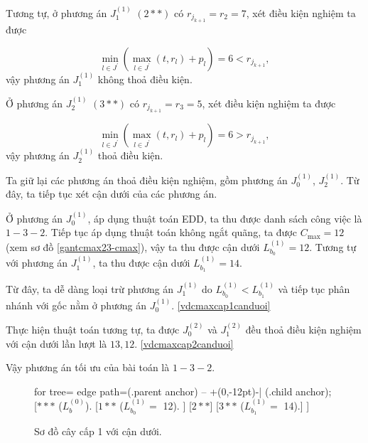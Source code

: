 \begin{vd}
Tương tự, ở phương án $J_1^{(1)}$ $(2**)$ có $r_{j_{k+1}} = r_2 = 7$, xét điều kiện nghiệm ta được

\begin{equation*}
\underset{l \in J^{'}}{\min} (\underset{l \in J^{'}}{\max} (t, r_l) + p_l) = 6 < r_{j_{k+1}},
\end{equation*}
vậy phương án $J_1^{(1)}$ không thoả điều kiện.


Ở phương án $J_2^{(1)}$ $(3**)$ có $r_{j_{k+1}} = r_3 = 5$, xét điều kiện nghiệm ta được

\begin{equation*}
\underset{l \in J^{'}}{\min} (\underset{l \in J^{'}}{\max} (t, r_l) + p_l) = 6 > r_{j_{k+1}},
\end{equation*}
vậy phương án $J_2^{(1)}$ thoả điều kiện.

Ta giữ lại các phương án thoả điều kiện nghiệm, gồm phương án $J_0^{(1)}$, $J_2^{(1)}$. Từ đây, ta tiếp tục xét cận dưới của các phương án.

Ở phương án $J_0^{(1)}$, áp dụng thuật toán EDD, ta thu được danh sách công việc là $1-3-2$. Tiếp tục áp dụng thuật toán không ngắt quãng, ta được $C_{\max} = 12$ (xem sơ đồ \eqref{gantcmax23-cmax}), vậy ta thu được cận dưới $L_{b_0}^{(1)} = 12$. Tương tự với phương án $J_1^{(1)}$, ta thu được cận dưới $L_{b_1}^{(1)} = 14$.

Từ đây, ta dễ dàng loại trừ phương án $J_1^{(1)}$ do $L_{b_0}^{(1)} < L_{b_1}^{(1)}$ và tiếp tục phân nhánh với gốc nằm ở phương án $J_0^{(1)}$. \eqref{vdcmaxcap1canduoi}

Thực hiện thuật toán tương tự, ta được $J_0^{(2)}$ và $J_1^{(2)}$ đều thoả điều kiện nghiệm với cận dưới lần lượt là $13,12$. \eqref{vdcmaxcap2canduoi}

Vậy phương án tối ưu của bài toán là $1-3-2$.



















\begin{figure}[h!]
	\centering
	\begin{forest} for tree={
		edge path={\noexpand{} (.parent anchor) -- +(0,-12pt)-| (.child anchor);}
	}
	[{$***$ ($L_b^{(0)}$).}
		[{$1**$ ($L_{b_0}^{(1)} =$ 12).}
		]
		[$2**$]
		[{$3**$ ($L_{b_1}^{(1)} =$ 14).}]
	]
	\end{forest}
\caption{\label{vdcmaxcap1canduoi} Sơ đồ cây cấp 1 với cận dưới.}
\end{figure}


\end{vd}
